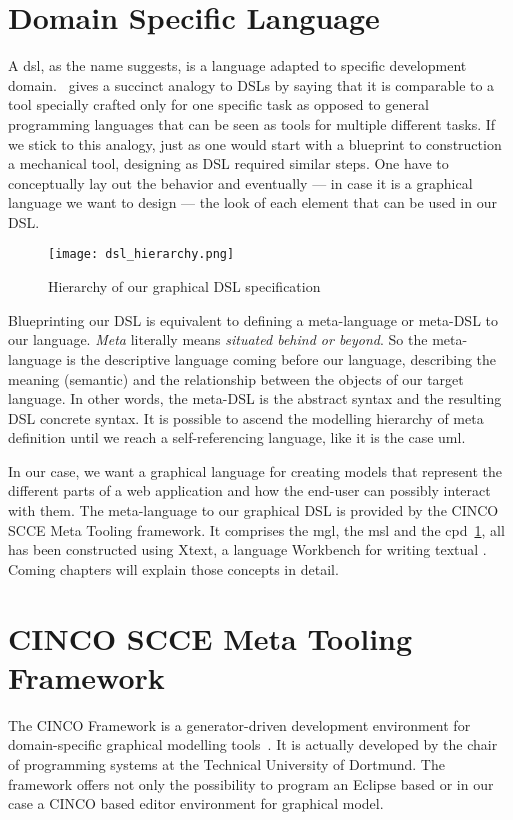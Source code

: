 \section{Domain Specific Language}

A \acrfull{dsl}, as the name suggests, is a language adapted to specific development domain.~\cite{Naujokat2018} gives a succinct analogy to DSLs by saying that it is comparable to a tool specially crafted only for one specific task as opposed to general programming languages that can be seen as tools for multiple different tasks. If we stick to this analogy, just as one would start with a blueprint to construction a mechanical tool, designing as DSL required similar steps. One have to conceptually lay out the behavior and eventually --- in case it is a graphical language we want to design --- the look of each element that can be used in our DSL. 

\begin{figure}[H]
    \texttt{[image: dsl\_hierarchy.png]}
    \caption{Hierarchy of our graphical DSL specification}\label{fig:modelling-hierachy}
\end{figure}

Blueprinting our DSL is equivalent to defining a meta-language or meta-DSL to our language. \textit{Meta} literally means \textit{situated behind or beyond}. So the meta-language is the descriptive language coming before our language, describing the meaning (semantic) and the relationship between the objects of our target language. In other words, the meta-DSL is the abstract syntax and the resulting DSL concrete syntax. It is possible to ascend the modelling hierarchy of meta definition until we reach a self-referencing language, like it is the case \acrfull{uml}.

In our case, we want a graphical language for creating models that represent the different parts of a web application and how the end-user can possibly interact with them. The meta-language to our graphical DSL is provided by the CINCO SCCE Meta Tooling framework. It comprises the \acrfull{mgl}, the \acrfull{msl} and the \acrfull{cpd}~\ref{fig:modelling-hierachy}, all has been constructed using Xtext, a language Workbench for writing textual . Coming chapters will explain those concepts in detail.

\section{CINCO SCCE Meta Tooling Framework}\label{sec:cincoTool}

The CINCO Framework is a generator-driven development environment for domain-specific graphical modelling tools~\cite{Cinco}. It is actually developed by the chair of programming systems at the Technical University of Dortmund. The framework offers not only the possibility to program an Eclipse based or in our case a CINCO based editor environment for graphical model. 